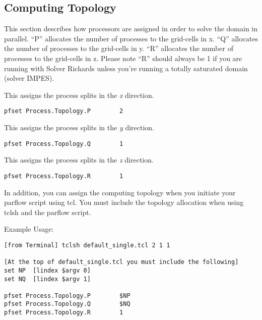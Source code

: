 \subsection{Computing Topology}
\label{Computing Topology}

This section describes how processors are assigned in order to solve the domain
in parallel. “P” allocates the number of processes to the grid-cells in x. “Q” allocates
the number of processes to the grid-cells in y. “R” allocates the number of processes to
the grid-cells in z. Please note “R” should always be 1 if you are running with Solver
Richards \cite{Jones-Woodward01} unless you’re running a totally saturated domain (solver 
IMPES).

{This assigns the process splits in the \emph{x} direction.}
\begin{display}\begin{verbatim} 
pfset Process.Topology.P        2
\end{verbatim}\end{display} 

{This assigns the process splits in the \emph{y} direction.}
\begin{display}\begin{verbatim} 
pfset Process.Topology.Q        1
\end{verbatim}\end{display} 

{This assigns the process splits in the \emph{z} direction.}
\begin{display}\begin{verbatim} 
pfset Process.Topology.R        1
\end{verbatim}\end{display} 

In addition, you can assign the computing topology when you initiate your parflow script using tcl. 
You must include the topology allocation when using tclsh and the parflow script.

Example Usage: \begin{verbatim}
[from Terminal] tclsh default_single.tcl 2 1 1

[At the top of default_single.tcl you must include the following]
set NP  [lindex $argv 0]
set NQ  [lindex $argv 1]

pfset Process.Topology.P        $NP
pfset Process.Topology.Q        $NQ
pfset Process.Topology.R        1 \end{verbatim}

